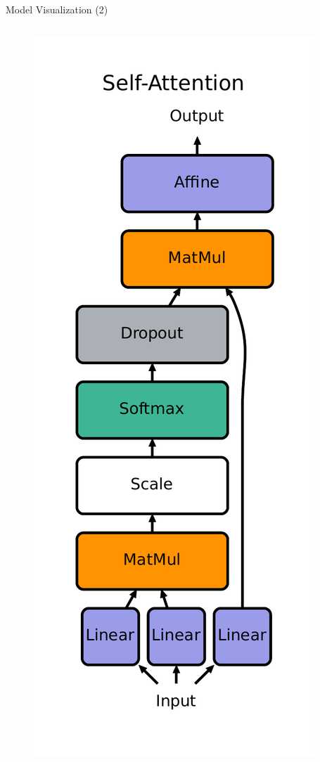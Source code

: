 \documentclass[10pt]{beamer}
\begin{document}
\begin{frame}[fragile]{Model Visualization (2)}
\begin{columns}
\begin{column}{0.3\textwidth}
\begin{figure}
    \centering
    \includegraphics[height=\textheight]{figures/model/self-attention.pdf}

\end{figure}
\end{column}
\end{columns}
\end{frame}
\end{document}

